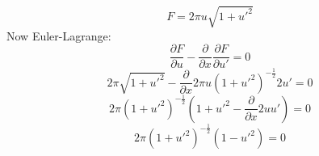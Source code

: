 \documentclass{article}
\title{}
\author{}
\date{\today}
\begin{document}
\[
F = 2\pi u \sqrt{ 1+u'^2 } 
\] 
Now Euler-Lagrange:
\[
\frac{\partial F}{\partial u} - \frac{\partial }{\partial x} \frac{\partial F}{\partial u'} = 0
\]
\[
	2\pi \sqrt{ 1+u'^2 }  - \frac{\partial }{\partial x} 2 \pi u (1+u'^2)^{-\frac{1}{2} }2u'=0
\] 
\[
	2\pi (1+u'^2)^{-\frac{1}{2} } (1+u'^2-\frac{\partial }{\partial x} 2uu')=0
\] 
\[
	2\pi (1+u'^2)^{-\frac{1}{2} }(1-u'^2) =0
\] 
\end{document}
